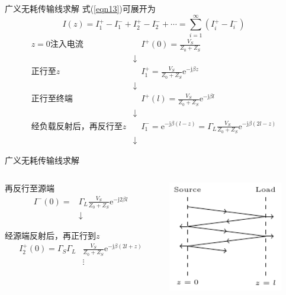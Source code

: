 \begin{frame}{广义无耗传输线求解}
  式(\ref{eqn13})可展开为
  $$I(z)=I_1^+-I_1^-+I_2^+-I_2^-+\cdots=\sum_{i=1}^{\infty}(I_i^+-I_i^-)$$
  \begin{align*}
    z=0\text{注入电流} &\quad I^+(0)=\frac{V_S}{Z_0+Z_S}\\
    &\downarrow\\
    \text{正行至}z &\quad I_1^+=\frac{V_S}{Z_0+Z_S}\mathrm{e}^{-\mathrm{j}\beta z}\\
    &\downarrow\\
    \text{正行至终端} &\quad I^+(l)=\frac{V_S}{Z_0+Z_S}\mathrm{e}^{-\mathrm{j}\beta l}\\
    &\downarrow\\
    \text{经负载反射后，再反行至}z &\quad I_1^-=\mathrm{e}^{-\mathrm{j}\beta (l-z)}=\Gamma_L\frac{V_S}{Z_0+Z_S}\mathrm{e}^{-\mathrm{j}\beta (2l-z)}\\
    &\downarrow
  \end{align*}
\end{frame}

\begin{frame}{广义无耗传输线求解}
  \begin{columns}
    \begin{column}{0.5\linewidth}
      \begin{center}
        再反行至源端
        \begin{align*}
          I^-(0)= & \Gamma_L\frac{V_S}{Z_0+Z_S}\mathrm{e}^{-\mathrm{j}2\beta l} \\
                  & \downarrow
        \end{align*}
      \end{center}

      \begin{center}
        经源端反射后，再正行到$z$
        \begin{align*}
          I_2^+(0)= \Gamma_S\Gamma_L&\frac{V_S}{Z_0+Z_S}\mathrm{e}^{-\mathrm{j}\beta(2l+z)} \\
                    & \vdots
        \end{align*}
      \end{center}

    \end{column}
    \begin{column}{0.5\linewidth}
      \includegraphics[width=5cm]{fig3-17.pdf}
    \end{column}
  \end{columns}

\end{frame}

